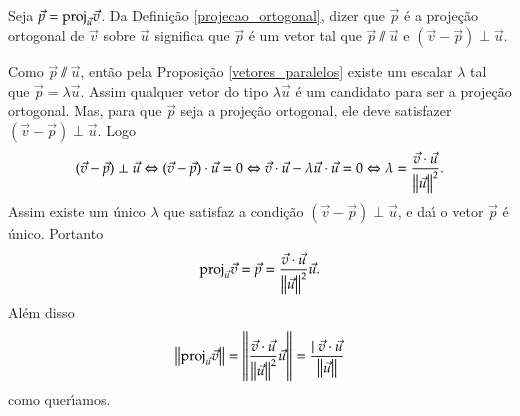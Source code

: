 \begin{prova}
  Seja $\vec{p} = {\rm proj}_{\vec{u}}\vec{v}$. Da Defini\c{c}\~ao \ref{projecao_ortogonal}, dizer que $\vec{p}$ \'e a proje\c{c}\~ao ortogonal de $\vec{v}$ sobre $\vec{u}$ significa que $\vec{p}$ \'e um vetor tal que $\vec{p}\varparallel\vec{u}$ e $(\vec{v} - \vec{p})\perp\vec{u}$.

  Como $\vec{p}\varparallel\vec{u}$, ent\~ao pela Proposi\c{c}\~ao \ref{vetores_paralelos} existe um escalar $\lambda$ tal que $\vec{p} = \lambda\vec{u}$. Assim qualquer vetor do tipo $\lambda\vec{u}$ \'e um candidato para ser a proje\c{c}\~ao ortogonal. Mas, para que $\vec{p}$ seja a proje\c{c}\~ao ortogonal, ele deve satisfazer $(\vec{v} - \vec{p})\perp\vec{u}$. Logo
  \begin{align*}
    (\vec{v} - \vec{p})\perp\vec{u} \Leftrightarrow (\vec{v} - \vec{p})\cdot\vec{u} = 0 \Leftrightarrow \vec{v}\cdot\vec{u} - \lambda\vec{u}\cdot\vec{u} = 0 \Leftrightarrow \lambda = \dfrac{\vec{v}\cdot\vec{u}}{\left\Vert{\vec{u}}\right\Vert^2}.
  \end{align*}
  Assim existe um \'unico $\lambda$ que satisfaz a condi\c{c}\~ao $(\vec{v} - \vec{p})\perp\vec{u}$, e da{\'\i} o vetor $\vec{p}$ \'e \'unico. Portanto
  \[
    {\rm proj}_{\vec{u}}\vec{v} = \vec{p} = \dfrac{\vec{v}\cdot\vec{u}}{\left\Vert{\vec{u}}\right\Vert^2}\vec{u}.
  \]
  Al\'em disso
  \[
    \left\Vert{{\rm proj}_{\vec{u}}\vec{v}}\right\Vert = \left\Vert{\dfrac{\vec{v}\cdot\vec{u}}{\left\Vert{\vec{u}}\right\Vert^2}\vec{u}}\right\Vert = \dfrac{\mid\vec{v}\cdot\vec{u}}{\left\Vert{\vec{u}}\right\Vert}
  \]
  como quer{\'\i}amos.
\end{prova}

